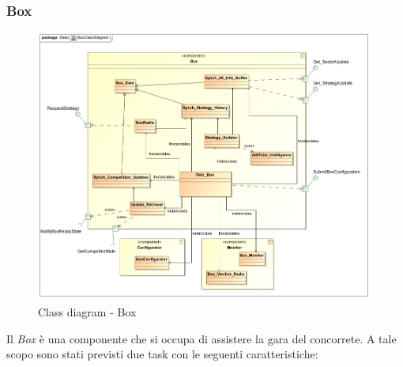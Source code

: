 \subsubsection{Box}
\label{box_class}
\begin{center}
\begin{figure}[h!]
\advance\leftskip-1.3cm
	\includegraphics[scale=0.50]{img/ClassDiagrams/BoxClassDiagram.jpg}
\caption{Class diagram - Box}
\end{figure}
\end{center}
Il \emph{Box} \`{e} una componente che si occupa di assistere la gara del concorrete. A tale scopo sono stati previsti due task con le seguenti 
caratteristiche:
